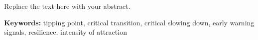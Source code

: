 Replace the text here with your abstract.	




\noindent\textbf{Keywords:} tipping point, critical transition, critical slowing down, early warning signals, resilience, intensity of attraction